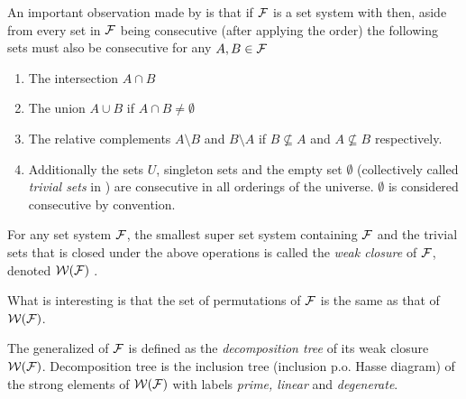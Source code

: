 An important observation made by \cite{mm96} is that if ${\cal F}$ is a set
system with \COP then, aside from every set in ${\cal F}$ being consecutive
(after applying the \COP order) the following sets must also be
consecutive for any $A, B \in {\cal F}$ 
\begin{enumerate}
  \item The intersection $A \cap B$ 
  \item The union $A \cup B$ if $A \cap B \ne \emptyset$
  \item The relative complements $A \setminus B$ and $B \setminus A$
    if $B \nsubseteq A$ and  $A \nsubseteq B$ respectively.
  \item Additionally the sets $U$, singleton sets and the empty set $\emptyset$
    (collectively called {\em trivial sets} in \cite{mm96}) are consecutive in all orderings
    of the universe. $\emptyset$ is considered consecutive by convention.
\end{enumerate}

For any set system ${\cal F}$, the smallest super set system containing
${\cal F}$ and the trivial sets that is closed under the above operations
is called the {\em weak closure} of ${\cal F}$, denoted ${\cal W}({\cal F})$
\cite[Def.~3.2]{mcc04} \cite[Def.~2]{mm96}.

What is interesting is that the set of \COP permutations of ${\cal F}$ is
the same as that of ${\cal W}({\cal F})$. \cite[Th.~3]{mm96}

The generalized \PQtree of ${\cal F}$ is defined as the {\em decomposition
  tree} of its weak closure ${\cal W}({\cal F})$. Decomposition tree is the
inclusion tree (inclusion p.o. Hasse diagram) of the strong elements
of ${\cal W}({\cal F})$ with labels {\em prime, linear} and {\em degenerate}.\cite{mcc04}


